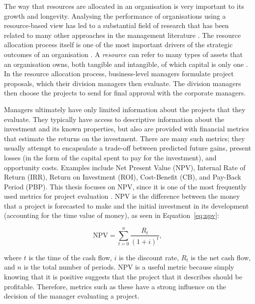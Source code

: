 \documentclass[a4paper, nobind, dvipsnames]{templates/ociamthesis}
\theoremstyle{definition}
\theoremstyle{definition}
\theoremstyle{definition}
\theoremstyle{definition}
\theoremstyle{remark}
\begin{document}
The way that resources are allocated in an organisation is very important to its
growth and longevity. Analysing the performance of organisations using a
resource-based view has led to a substantial field of research that has been
related to many other approaches in the management literature \autocite{mahoney1992,barney1991}. The resource allocation process itself is one of the most
important drivers of the strategic outcomes of an organisation \autocite{bower1970,bower2005}. A \emph{resource} can refer to many types of assets that an organisation
owns, both tangible and intangible, of which capital is only one
\autocite{wernerfelt1984}. In the resource allocation process, business-level managers
formulate project proposals, which their division managers then evaluate. The
division managers then choose the projects to send for final approval with the
corporate managers.

Managers ultimately have only limited information about the projects that they
evaluate. They typically have access to descriptive information about the
investment and its known properties, but also are provided with financial
metrics that estimate the returns on the investment. There are many such
metrics; they usually attempt to encapsulate a trade-off between predicted
future gains, present losses (in the form of the capital spent to pay for the
investment), and opportunity costs. Examples include Net Present Value (NPV),
Internal Rate of Return (IRR), Return on Investment (ROI), Cost-Benefit (CB),
and Pay-Back Period (PBP). This thesis focuses on NPV, since it is one of the
most frequently used metrics for project evaluation \autocite{graham2001,remer1993}.
NPV is the difference between the money that a project is forecasted to make and
the initial investment in its development (accounting for the time value of
money), as seen in Equation~\eqref{eq:npv}:

\begin{equation}
\text{NPV}=\sum_{t=0}^n \frac{R_t}{(1+i)^t}, \label{eq:npv}
\end{equation}

where \(t\) is the time of the cash flow, \(i\) is the discount rate, \(R_t\) is the
net cash flow, and \(n\) is the total number of periods. NPV is a useful metric
because simply knowing that it is positive suggests that the project that it
describes should be profitable. Therefore, metrics such as these have a strong
influence on the decision of the manager evaluating a project.
\end{document}
